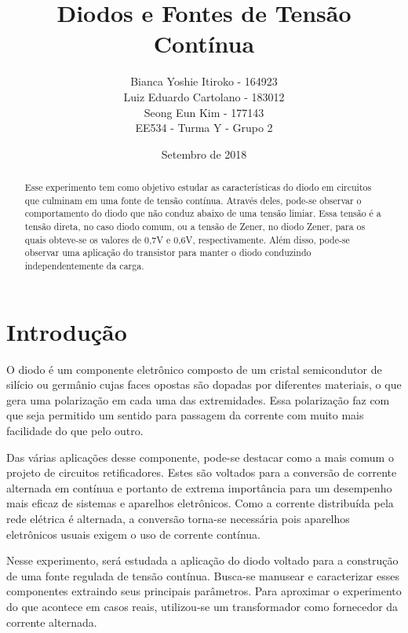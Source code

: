 \documentclass{article}
\begin{document}
\title{Diodos e Fontes de Tensão Contínua}
\author{Bianca Yoshie Itiroko - 164923 \\ Luiz Eduardo Cartolano - 183012 \\ Seong Eun Kim - 177143 \\ EE534 - Turma Y - Grupo 2}
\date{Setembro de 2018}

\maketitle

\begin{abstract}
Esse experimento tem como objetivo estudar as características do diodo em circuitos que culminam em uma fonte de tensão contínua. Através deles, pode-se observar o comportamento do diodo que não conduz abaixo de uma tensão limiar. Essa tensão é a tensão direta, no caso diodo comum, ou a tensão de Zener, no diodo Zener, para os quais obteve-se os valores de 0,7V e 0,6V, respectivamente. Além disso, pode-se observar uma aplicação do transistor para manter o diodo conduzindo independentemente da carga. 

\end{abstract}

\section{Introdução}
O diodo é um componente eletrônico composto de um cristal semicondutor de silício ou germânio cujas faces opostas são dopadas por diferentes materiais, o que gera uma polarização em cada uma das extremidades. Essa polarização faz com que seja permitido um sentido para passagem da corrente com muito mais facilidade do que pelo outro.

Das várias aplicações desse componente, pode-se destacar como a mais comum o projeto de circuitos retificadores. Estes são voltados para a conversão de corrente alternada em contínua e portanto de extrema importância para um desempenho mais eficaz de sistemas e aparelhos eletrônicos. Como a corrente distribuída pela rede elétrica é alternada, a conversão torna-se necessária pois aparelhos eletrônicos usuais exigem o uso de corrente contínua.

Nesse experimento, será estudada a aplicação do diodo voltado para a construção de uma fonte regulada de tensão contínua. Busca-se manusear e caracterizar esses componentes extraindo seus principais parâmetros. Para aproximar o experimento do que acontece em casos reais, utilizou-se um transformador como fornecedor da corrente alternada.
\end{document}
